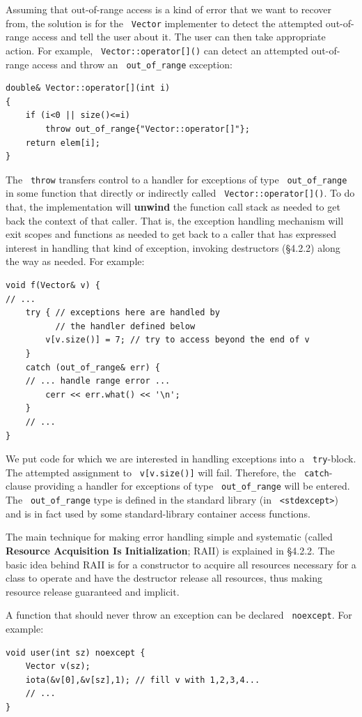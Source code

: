 \documentclass[11pt]{article}
\let\OldTexttt\texttt
\renewcommand{\texttt}[1]{\OldTexttt{\color{MidnightBlue} #1}}
\begin{document}
Assuming that out-of-range access is a kind of error that we want to recover from, the solution
is for the \texttt{Vector} implementer to detect the attempted out-of-range access and tell the user
about it. The user can then take appropriate action. For example, \texttt{Vector::operator[]()} can
detect an attempted out-of-range access and throw an \texttt{out\_of\_range} exception:
\begin{verbatim}
double& Vector::operator[](int i)
{
    if (i<0 || size()<=i)
        throw out_of_range{"Vector::operator[]"};
    return elem[i];
}
\end{verbatim}
The \texttt{throw} transfers control to a handler for exceptions of type \texttt{out\_of\_range} in some function that
directly or indirectly called \texttt{Vector::operator[]()}. To do that, the implementation will \textbf{unwind}
the function call stack as needed to get back the context of that caller. That is, the exception
handling mechanism will exit scopes and functions as needed to get back to a caller that has
expressed interest in handling that kind of exception, invoking destructors (§4.2.2) along the
way as needed. For example:

\begin{verbatim}
void f(Vector& v) {
// ...
    try { // exceptions here are handled by
          // the handler defined below
        v[v.size()] = 7; // try to access beyond the end of v
    }
    catch (out_of_range& err) {
    // ... handle range error ...
        cerr << err.what() << '\n';
    }
    // ...
}
\end{verbatim}

We put code for which we are interested in handling exceptions into a \texttt{try}-block. The attempted
assignment to \texttt{v[v.size()]} will fail. Therefore, the \texttt{catch}-clause providing a handler for
exceptions of type \texttt{out\_of\_range} will be entered. The \texttt{out\_of\_range} type is defined in the standard
library (in \texttt{<stdexcept>}) and is in fact used by some standard-library container access
functions.

The main technique for making error handling simple and systematic (called \textbf{Resource Acquisition
Is Initialization}; RAII) is explained in §4.2.2. The basic idea behind RAII is for a constructor
to acquire all resources necessary for a class to operate and have the destructor release all
resources, thus making resource release guaranteed and implicit.

A function that should never throw an exception can be declared \texttt{noexcept}. For example:
\begin{verbatim}
void user(int sz) noexcept {
    Vector v(sz);
    iota(&v[0],&v[sz],1); // fill v with 1,2,3,4...
    // ...
}
\end{verbatim}
\end{document}
